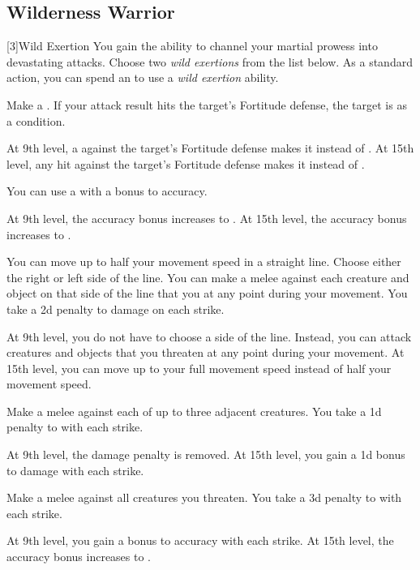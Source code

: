         \subsection{Wilderness Warrior}
            [3]{Wild Exertion} 
            You gain the ability to channel your martial prowess into devastating attacks.
            Choose two \textit{wild exertions} from the list below.
            As a standard action, you can spend an  to use a \textit{wild exertion} ability.
            {
                 Make a .
                If your attack result hits the target's Fortitude defense, the target is \sickened as a condition.

                At 9th level, a  against the target's Fortitude defense makes it \nauseated instead of \sickened.
                At 15th level, any hit against the target's Fortitude defense makes it \nauseated instead of \sickened.

                 You can use a  with a  bonus to accuracy.

                At 9th level, the accuracy bonus increases to .
                At 15th level, the accuracy bonus increases to .

                 You can move up to half your movement speed in a straight line.
                Choose either the right or left side of the line.
                You can make a melee  against each creature and object on that side of the line that you  at any point during your movement.
                You take a \minus2d penalty to damage on each strike.

                At 9th level, you do not have to choose a side of the line.
                Instead, you can attack creatures and objects that you threaten at any point during your movement.
                At 15th level, you can move up to your full movement speed instead of half your movement speed.

                 Make a melee  against each of up to three adjacent creatures.
                You take a \minus1d penalty to  with each strike.

                At 9th level, the damage penalty is removed.
                At 15th level, you gain a \plus1d bonus to damage with each strike.

                 Make a melee  against all creatures you threaten.
                You take a \minus3d penalty to  with each strike.

                At 9th level, you gain a  bonus to accuracy with each strike.
                At 15th level, the accuracy bonus increases to .
            }

